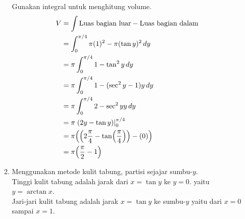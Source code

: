 \begin{enumerate}[leftmargin=*, label={\arabic*}.]
\begin{enumerate}[label={\alph*}.]
    Gunakan integral untuk menghitung volume.
    \begin{align*}
        V &= \int \text{Luas bagian luar} - \text{Luas bagian dalam}\\
        &=\int_{0}^{\pi/4} \pi(1)^2 - \pi(\tan y)^2\,dy\\
        &=\pi\int_{0}^{\pi/4} 1-\tan^{2} y\,dy\\
        &=\pi\int_{0}^{\pi/4} 1-(\sec^{2}y-1) y\,dy\\
        &=\pi\int_{0}^{\pi/4} 2-\sec^{2}y y\,dy\\
        &=\pi\eval{2y-\tan y}{0}{\pi/4}\\
        &=\pi\brk*{\brk*{2\frac{\pi}{4}-\tan\brk*{\frac{\pi}{4}}}-(0)}\\
        &=\pi\brk*{\frac{\pi}{2}-1}
    \end{align*}
    \item Menggunakan metode kulit tabung, partisi sejajar sumbu-$y$.\\
    Tinggi kulit tabung adalah jarak dari $x=\tan y$ ke $y=0$. yaitu $y=\arctan x$.\\
    Jari-jari kulit tabung adalah jarak $x=\tan y$ ke sumbu-$y$ yaitu dari $x=0$ 
    sampai $x=1$.


\end{enumerate}
\end{enumerate}
